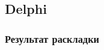 \documentclass{beamer}
\begin{document}

\subsection{Delphi}
\begin{frame}
\frametitle{Результат раскладки}
\begin{figure}[htbp]
	\begin{minipage}[b]{0.49\linewidth}
	\end{minipage}
\hfill
\begin{minipage}[b]{0.49\linewidth}

\end{minipage}
\end{figure}
\end{frame}
\end{document}
